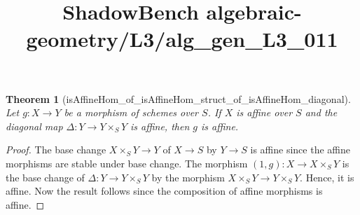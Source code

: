 \documentclass{article}
\title{ShadowBench algebraic-geometry/L3/alg\_gen\_L3\_011}
\newtheorem{theorem}{Theorem}
\begin{document}
\maketitle

\begin{theorem}[isAffineHom_of_isAffineHom_struct_of_isAffineHom_diagonal] Let $g:X \to Y$ be a morphism of schemes over $S$. If $X$ is affine over $S$ and the diagonal map $\Delta:Y \to Y \times_S Y$ is affine, then $g$ is affine.
\end{theorem}
\begin{proof}
    The base change \(X\times_S Y \to Y\) of \(X \to S\) by \(Y \to S\) is affine since the affine morphisms are stable under base change. The morphism \((1,g):X \to X \times_S Y\) is the base change of \(\Delta:Y \to Y\times_S Y\) by the morphism \(X \times_S Y \to Y\times_SY\). Hence, it is affine. Now the result follows since the composition of affine morphisms is affine.
\end{proof}
\end{document}
